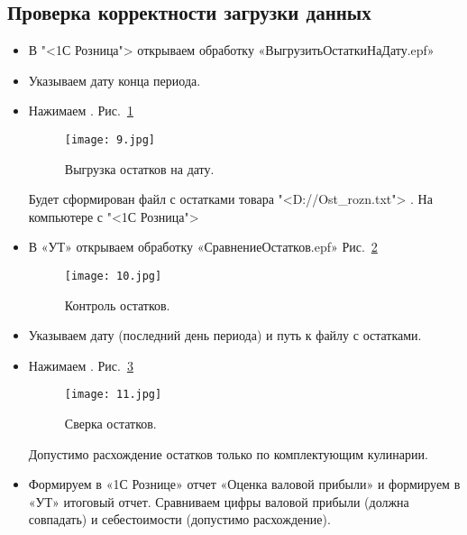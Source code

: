 \subsection{Проверка корректности загрузки данных}

\begin{itemize}	
	\item В "<1С Розница"> открываем обработку «ВыгрузитьОстаткиНаДату.epf»
	\item Указываем дату конца периода.
	\item Нажимаем .
	Рис.~\ref{ris:9.jpg}	
	\begin{figure}[H]
		\texttt{[image: 9.jpg]}
		\caption{Выгрузка остатков на дату.}
		\label{ris:9.jpg}
	\end{figure}
Будет сформирован файл с остатками товара "<D://Ost\_rozn.txt"> . На компьютере с "<1С Розница">	

	\item В «УТ» открываем обработку «СравнениеОстатков.epf»
	Рис.~\ref{ris:10.jpg}	
	\begin{figure}[H]
		\texttt{[image: 10.jpg]}
		\caption{Контроль остатков.}
		\label{ris:10.jpg}
	\end{figure}	
	\item Указываем дату (последний день периода) и путь к файлу с остатками.
	\item Нажимаем .	
	Рис.~\ref{ris:11.jpg}	
	\begin{figure}[H]
		\texttt{[image: 11.jpg]}
		\caption{Сверка остатков.}
		\label{ris:11.jpg}
	\end{figure}		
Допустимо расхождение остатков только по комплектующим кулинарии. \par


	\item Формируем в «1С Рознице» отчет «Оценка валовой прибыли» и формируем в «УТ» итоговый отчет. Сравниваем цифры валовой прибыли (должна совпадать) и себестоимости (допустимо расхождение). 



\end{itemize}
